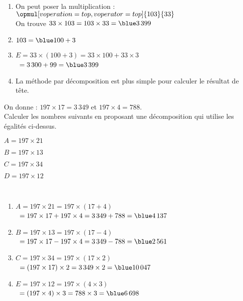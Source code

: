 \begin{colonne*exercice}
\begin{corrige}
   \ \\ [-7mm]
   \begin{enumerate}
      \item On peut poser la multiplication : \qquad $\opmul[voperation=top,voperator=top]{103}{33}$ \\
         On trouve $33\times103 =103\times33 =\blue 3\,399$
      \item $103 =\blue 100+3$
      \item $E =33\times(100+3) =33\times100+33\times3$ \\
         \quad\, $=3\,300+99 =\blue 3\,399$
      \item La {\blue méthode par décomposition} est plus simple pour calculer le résultat de tête.
   \end{enumerate}
\end{corrige}

\bigskip


\begin{exercice} %
   On donne : $197\times17 =3\,349$ et $197\times4 =788$. \\
   Calculer les nombres suivants en proposant une décomposition qui utilise les égalités ci-dessus.
   \begin{colenumerate}{2}
      \item $A =197\times21$
      \item $B =197\times13$
      \item $C =197\times34$
      \item $D =197\times12$
   \end{colenumerate}
\end{exercice}

\begin{corrige}
   \ \\ [-5mm]\begin{enumerate}
      \item $A =197\times21 =197\times(17+4) $\\
         \quad\, $=197\times17+197\times4 =3\,349+788 =\blue 4\,137$
      \item $B =197\times13 =197\times(17-4)$ \\
         \quad\, $=197\times17-197\times4 =3\,349-788 =\blue 2\,561$
      \item $C =197\times34 =197\times(17\times2)$ \\
         \quad\, $=(197\times17)\times2 =3\,349\times2 =\blue 10\,047$
      \item $E =197\times12 =197\times(4\times3)$ \\
         \quad\, $=(197\times4)\times3 =788\times3 =\blue 6\,698$
   \end{enumerate}
\end{corrige}


\end{colonne*exercice}
